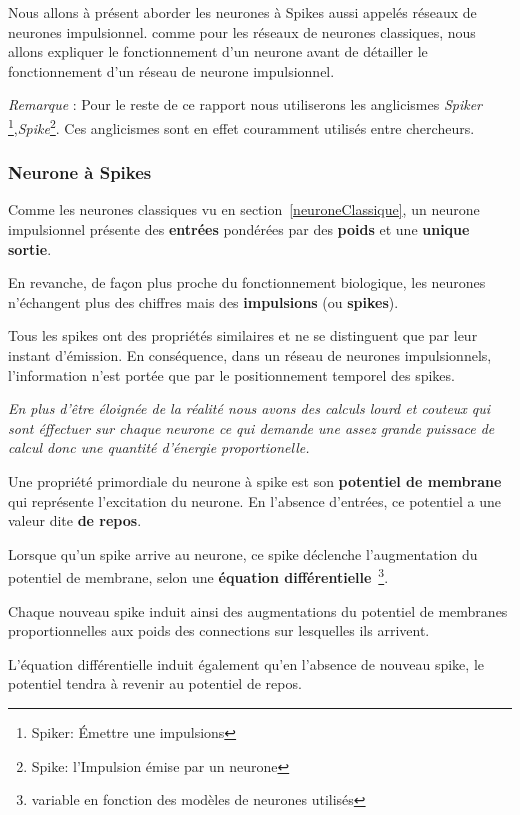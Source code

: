Nous allons à présent aborder les neurones à Spikes aussi appelés réseaux de neurones impulsionnel. comme pour les réseaux de neurones classiques, nous allons expliquer le fonctionnement d'un neurone avant de détailler le fonctionnement d'un réseau de neurone impulsionnel.

\textit{Remarque} : Pour le reste de ce rapport nous utiliserons les anglicismes \textit{Spiker} \footnote{Spiker: Émettre une impulsions},\textit{Spike}\footnote{Spike: l'Impulsion émise par un neurone}.
Ces anglicismes sont en effet couramment utilisés entre chercheurs.

\subsubsection{Neurone à Spikes}
\label{neuroneSpike}

Comme les neurones classiques vu en section~\ref{neuroneClassique}, un neurone impulsionnel présente des \textbf{entrées} pondérées par des \textbf{poids} et une \textbf{unique sortie}.

En revanche, de façon plus proche du fonctionnement biologique, les neurones n'échangent plus des chiffres mais des \textbf{impulsions} (ou \textbf{spikes}).

Tous les spikes ont des propriétés similaires et ne se distinguent que par leur instant d'émission. En conséquence, dans un réseau de neurones impulsionnels, l'information n'est portée que par le positionnement temporel des spikes.

\textit{En plus d'être éloignée de la réalité nous avons des calculs lourd et couteux qui sont éffectuer sur chaque neurone ce qui demande une assez grande puissace de calcul donc une quantité d'énergie proportionelle.}

Une propriété primordiale du neurone à spike est son \textbf{potentiel de membrane} qui représente l'excitation du neurone.
En l'absence d'entrées, ce potentiel a une valeur dite \textbf{de repos}.

Lorsque qu'un spike arrive au neurone, ce spike déclenche l'augmentation du potentiel de membrane, selon une \textbf{équation différentielle}~\footnote{variable en fonction des modèles de neurones utilisés}.

Chaque nouveau spike induit ainsi des augmentations du potentiel de membranes proportionnelles aux poids des connections sur lesquelles ils arrivent.

L'équation différentielle induit également qu'en l'absence de nouveau spike, le potentiel tendra à revenir au potentiel de repos.

